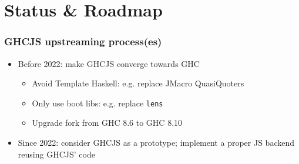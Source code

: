 \documentclass[aspectratio=169]{beamer}
\begin{document}
\section{Status \& Roadmap}

\begin{frame}
\frametitle{GHCJS upstreaming process(es)}

\begin{itemize}
\item Before 2022: make GHCJS converge towards GHC
\begin{itemize}
\item Avoid Template Haskell: e.g. replace JMacro QuasiQuoters
\item Only use boot libs: e.g. replace \texttt{lens}
\item Upgrade fork from GHC 8.6 to GHC 8.10
\end{itemize}

\item Since 2022: consider GHCJS as a prototype; implement a proper JS backend reusing GHCJS’ code
\end{itemize}
\end{frame}
\end{document}
